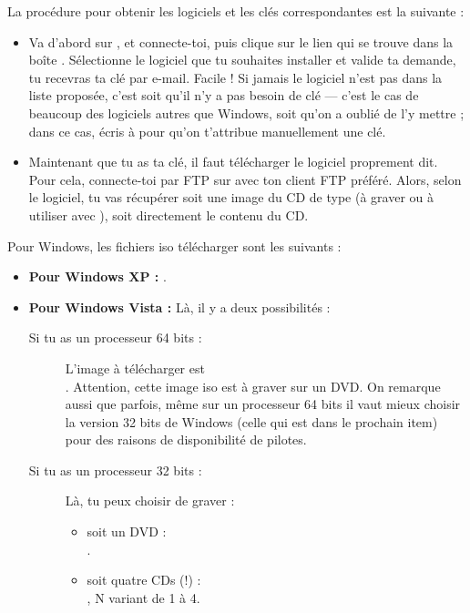 La proc\'edure pour obtenir les logiciels et les cl\'es correspondantes
est la suivante :
\begin{itemize}

\item Va d'abord sur \fkz, et connecte-toi, puis clique sur le lien  qui se trouve dans la bo\^ite . S\'electionne le logiciel que tu souhaites installer et valide ta demande, tu recevras ta cl\'e par e-mail. Facile ! Si jamais le logiciel n'est pas dans la liste propos\'ee, c'est soit qu'il n'y a pas besoin de cl\'e --- c'est le cas de beaucoup des logiciels autres que Windows, soit qu'on a oubli\'e de l'y mettre ; dans ce cas, \'ecris \`a  pour qu'on t'attribue manuellement une cl\'e.

\item Maintenant que tu as ta cl\'e, il faut t\'el\'echarger le logiciel proprement
dit. Pour cela, connecte-toi par FTP sur  avec ton client FTP pr\'ef\'er\'e.
Alors, selon le logiciel, tu vas r\'ecup\'erer soit une image du CD de type  (\`a
graver ou \`a utiliser avec ), soit directement le contenu du CD.
\end{itemize}

Pour Windows, les fichiers iso t\'el\'echarger sont les suivants :
\begin{itemize}
\item \textbf{Pour Windows XP :}
.

\item \textbf{Pour Windows Vista :}
L\`a, il y a deux possibilit\'es :
\begin{description}
\item[Si tu as un processeur 64 bits :] L'image \`a t\'el\'echarger est \\
. Attention, cette
image iso est \`a graver sur un DVD. On remarque aussi que parfois, m\^eme sur un processeur 64 bits il
vaut mieux choisir la version 32 bits de Windows (celle qui est dans le prochain item) pour des
raisons de disponibilit\'e de pilotes.
\item[Si tu as un processeur 32 bits :] L\`a, tu peux choisir de graver :
\begin{itemize}
\item soit un DVD : \\
.
\item soit quatre CDs (!) : \\
, N variant
de 1 \`a 4.

\end{itemize}
\end{description}

\end{itemize}

